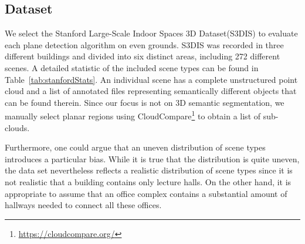 \documentclass[main.tex]{subfiles}
\begin{document}
\subsection{Dataset}
We select the Stanford Large-Scale Indoor Spaces 3D Dataset(S3DIS)\cite{2017arXiv170201105A} to evaluate each plane detection algorithm on even grounds. 
S3DIS was recorded in three different buildings and divided into six distinct areas, including 272 different scenes. A detailed statistic of the included scene types can be found in Table~\ref{tab:stanfordStats}.
An individual scene has a complete unstructured point cloud and a list of annotated files representing semantically different objects that can be found therein.
Since our focus is not on 3D semantic segmentation, we manually select planar regions using CloudCompare\footnote{\href{https://cloudcompare.org/}{https://cloudcompare.org/}} to obtain a list of sub-clouds.

Furthermore, one could argue that an uneven distribution of scene types introduces a particular bias. While it is true that the distribution is quite uneven, the data set nevertheless reflects a realistic distribution of scene types since 
it is not realistic that a building contains only lecture halls. On the other hand, it is appropriate to assume that an office complex contains a substantial amount of hallways needed to connect all these offices.
\end{document}
